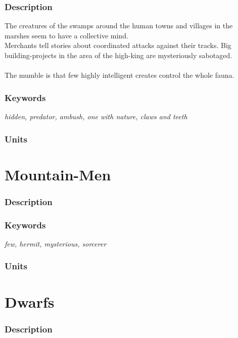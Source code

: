 \documentclass[a5paper,pagesize,10pt,bibtotoc,pointlessnumbers,
normalheadings,DIV=9,twoside=false]{scrbook}
\begin{document}
\subsubsection{Description}
The creatures of the swamps around the human towns and villages in the marshes seem to have a collective mind.\\
Merchants tell stories about coordinated attacks against their tracks. Big building-projects in the area of the high-king are mysteriously sabotaged.\\
\\
The mumble is that few highly intelligent creates control the whole fauna.

\subsubsection{Keywords}
\emph{hidden, predator, ambush, one with nature, claws and teeth}

\subsubsection{Units}


\newpage
\section{Mountain-Men}

\subsubsection{Description}

\subsubsection{Keywords}
\emph{few, hermit, mysterious, sorcerer}

\subsubsection{Units}

\newpage
\section{Dwarfs}

\subsubsection{Description}
\end{document}
